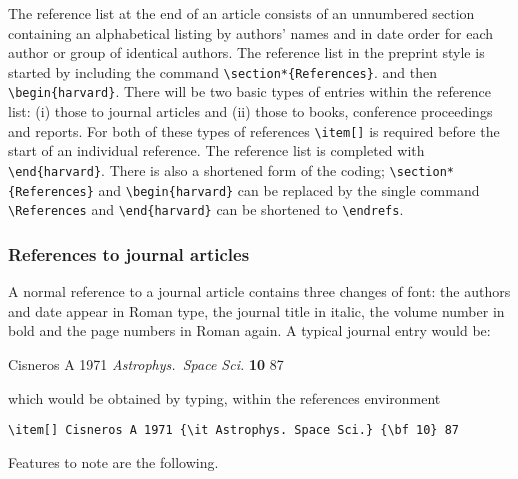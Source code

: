 The reference list at the end of an article consists of an
unnumbered section containing an
alphabetical listing by authors' names and in date order for each
author or group of identical authors. The reference list in the
preprint style is started by including the command
\verb"\section*{References}". and then
\verb"\begin{harvard}".
There will be two basic types of
entries within the reference list: (i) those to journal articles and
(ii) those to books, conference proceedings and reports. For both of
these types of references \verb"\item[]"
is required before the start of an individual reference.
The reference list is completed with \verb"\end{harvard}".
There is also a shortened form of the coding; \verb"\section*{References}"
and \verb"\begin{harvard}" can be replaced by the single command
\verb"\References" and \verb"\end{harvard}" can be shortened to
\verb"\endrefs".


\subsubsection{References to journal articles}
A normal reference to a journal article contains three changes of
font:
the authors and date appear in Roman type, the journal title in
italic, the volume number in bold and the page numbers in Roman again.
A typical journal entry would be:

\smallskip
\begin{harvard}
\item[] Cisneros A 1971 {\it Astrophys.\ Space Sci.} {\bf 10} 87
\end{harvard}
\smallskip

\noindent which would be obtained by typing, within the references
environment
\begin{verbatim}
\item[] Cisneros A 1971 {\it Astrophys. Space Sci.} {\bf 10} 87
\end{verbatim}

Features to note are the following.

